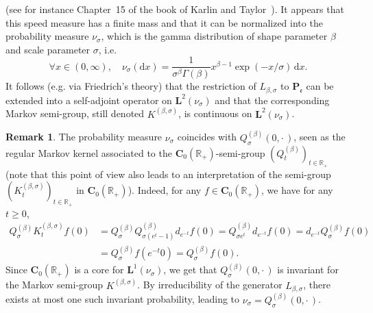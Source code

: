 \documentclass[10pt]{amsart}
\theoremstyle{definition}\newtheorem{defi}[theo]{Definition}\newtheorem{rema}[theo]{Remark}\newtheorem{exam}[theo]{Example}\newtheorem{exem}[theo]{Example}\newtheorem{nota}[theo]{Notation}
\newcommand{\RR}{\mathbb{R}}
\newcommand{\fe}{\mathfrak{e}}
\newcommand{\iy}{\infty}
\newcommand{\esP}{\mathbf{P}}
\newcommand{\esL}{\mathbf{L}}
\newcommand{\esC}{\mathbf{C}}
\newcommand{\esPe}{\esP_{\! \fe}}
\let\oldforall\forall
\renewcommand*{\forall}{\mathrel{\oldforall}}
\newcommand*{\dd}{\mathrm{d}}
\newcommand*{\dx}{\dd x}
\begin{document}
(see for instance Chapter~15 of the book of Karlin and Taylor~\cite{MR611513}). It appears that this speed measure has a finite mass and that it can be normalized into the probability measure $\nu_{\sigma}$, which is the gamma distribution of shape parameter $\beta$ and scale parameter $\sigma$, i.e.
\[
\forall x\in(0,\iy),\quad \nu_{\sigma}(\dx)= \frac{1}{\sigma^{\beta}\Gamma(\beta)}x^{\beta-1}\exp(-x/\sigma)\, \dx.
\]
It follows (e.g. via Friedrich's theory) that the restriction of $L_{\beta,\sigma}$ to $\esPe$ can be extended into a self-adjoint operator on $\esL^2(\nu_{\sigma})$ and that the corresponding Markov semi-group, still denoted $K^{(\beta,\sigma)}$, is continuous on $\esL^2(\nu_{\sigma})$.

\begin{rema}\label{Q0dot}
The probability measure $\nu_{\sigma}$ coincides with $Q^{(\beta)}_{\sigma}(0,{\cdot\,})$, seen as the regular Markov kernel associated to the $\esC_0(\RR_+)$-semi-group $(Q^{(\beta)}_t)_{t\in\RR_+}$ (note that this point of view also leads to an interpretation of the semi-group $(K^{(\beta,\sigma)}_t)_{t\in\RR_+}$ in $\esC_0(\RR_+)$). Indeed, for any $f\in\esC_0(\RR_+)$, we have for any $t\geq 0$,
\begin{align*}
Q^{(\beta)}_\sigma K_t^{(\beta,\sigma)}f(0)&=Q^{(\beta)}_\sigma Q^{(\beta)}_{\sigma(e^{t}-1)}d_{e^{-t}} f(0) =Q^{(\beta)}_{\sigma e^{t}}d_{e^{-t}}f(0) =d_{e^{-t}}Q^{(\beta)}_\sigma f(0)\\
&=Q^{(\beta)}_\sigma f(e^{-t}0)=Q^{(\beta)}_\sigma f (0).
\end{align*}
Since $\esC_0(\RR_+)$ is a core for $\esL^1(\nu_{\sigma})$, we get that $Q^{(\beta)}_{\sigma}(0,{\cdot\,})$ is invariant for the Markov semi-group $K^{(\beta,\sigma)}$. By irreducibility of the generator $L_{\beta,\sigma}$, there exists at most one such invariant probability, leading to $\nu_{\sigma}=Q^{(\beta)}_{\sigma}(0,{\cdot\,})$.



\end{rema}
\end{document}
